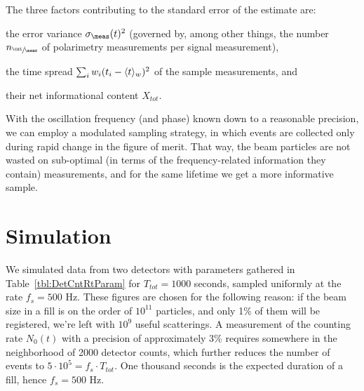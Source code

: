 \documentclass{article}
\begin{document}
The three factors contributing to the standard error of the estimate are:
\begin{inparaenum}
	\item the error variance $\SD{\meas}(t)^2$ (governed by, among other things, the number $\Ncm$ of polarimetry measurements per signal measurement), 
	\item the time spread $\sum_i w_i (t_i - \avg{t}[w])^2$ of the sample measurements, and
	\item their net informational content $X_{tot}$.
\end{inparaenum}


With the oscillation frequency (and phase) known down to a reasonable precision, we can employ a modulated sampling strategy, in which events are collected only during rapid change in the figure of merit. That way, the beam particles are not wasted on sub-optimal (in terms of the frequency-related information they contain) measurements, and for the same lifetime we get a more informative sample.


\section{Simulation}
We simulated data from two detectors with parameters gathered in Table~\ref{tbl:DetCntRtParam} for $T_{tot}=1000$ seconds, sampled uniformly at the rate $f_s = 500$ Hz. These figures are chosen for the following reason: if the beam size in a fill is on the order of $10^{11}$ particles, and only 1\% of them will be registered, we're left with $10^9$ useful scatterings. A measurement of the counting rate $N_0(t)$ with a precision of approximately 3\% requires somewhere in the neighborhood of 2000 detector counts, which further reduces the number of events to $5\cdot 10^5 = f_s\cdot T_{tot}$. One thousand seconds is the expected duration of a fill, hence $f_s = 500$ Hz. 
\end{document}
